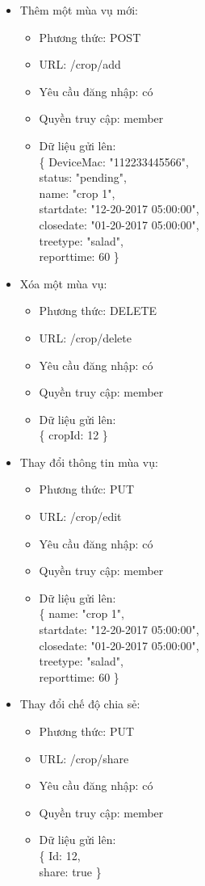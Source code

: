\documentclass[a4paper,12pt,oneside]{article}
\begin{document}
\begin{itemize}
\begin{itemize}
\item Thêm một mùa vụ mới:
	\begin{itemize}
	\item Phương thức: POST
	\item URL: /crop/add
	\item Yêu cầu đăng nhập: có
	\item Quyền truy cập: member
	\item Dữ liệu gửi lên:\\ 
		\{
			DeviceMac: "112233445566",\\
			status: "pending",\\
			name: "crop 1",\\
			startdate: "12-20-2017 05:00:00",\\
			closedate: "01-20-2017 05:00:00",\\
			treetype: "salad",\\
			reporttime: 60
		\}
	\end{itemize}

\item Xóa một mùa vụ:
	\begin{itemize}
	\item Phương thức: DELETE
	\item URL: /crop/delete
	\item Yêu cầu đăng nhập: có
	\item Quyền truy cập: member
	\item Dữ liệu gửi lên:\\ 
		\{
			cropId: 12
		\}
	\end{itemize}
	
\item Thay đổi thông tin mùa vụ:
	\begin{itemize}
	\item Phương thức: PUT
	\item URL: /crop/edit
	\item Yêu cầu đăng nhập: có
	\item Quyền truy cập: member
	\item Dữ liệu gửi lên:\\ 
		\{
			name: "crop 1",\\
			startdate: "12-20-2017 05:00:00",\\
			closedate: "01-20-2017 05:00:00",\\
			treetype: "salad",\\
			reporttime: 60
		\}
	\end{itemize}
	
\item Thay đổi chế độ chia sẻ:
	\begin{itemize}
	\item Phương thức: PUT
	\item URL: /crop/share
	\item Yêu cầu đăng nhập: có
	\item Quyền truy cập: member
	\item Dữ liệu gửi lên:\\ 
		\{
			Id: 12,\\
			share: true
		\}
	\end{itemize}


\end{itemize}
\end{itemize}
\end{document}
